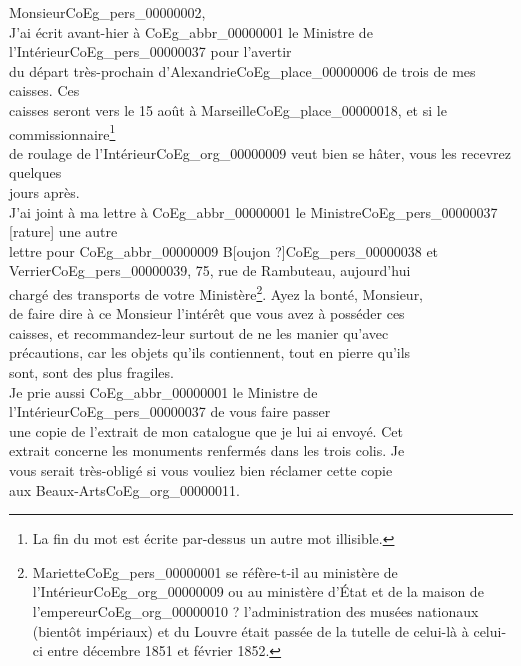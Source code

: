 \documentclass{book}
\begin{document}
\hspace{1cm}Monsieur\gls{CoEg_pers_00000002},\\

\indent J’ai écrit avant-hier à \gls{CoEg_abbr_00000001} le Ministre de l’Intérieur\gls{CoEg_pers_00000037} pour l’avertir\\
du départ très-prochain d’Alexandrie\gls{CoEg_place_00000006} de trois de mes caisses. Ces\\
caisses seront vers le 15 août à Marseille\gls{CoEg_place_00000018}, et si le commissionnaire\footnote{La fin du mot est écrite par-dessus un autre mot illisible.}\\
de roulage de l’Intérieur\gls{CoEg_org_00000009} veut bien se hâter, vous les recevrez quelques\\
jours après.\\
\indent J’ai joint à ma lettre à \gls{CoEg_abbr_00000001} le Ministre\gls{CoEg_pers_00000037} [rature] une autre\\
lettre pour \gls{CoEg_abbr_00000009} B{[oujon ?]}\gls{CoEg_pers_00000038} et Verrier\gls{CoEg_pers_00000039}, 75, rue de Rambuteau, aujourd’hui\\
chargé des transports de votre Ministère\footnote{Mariette\gls{CoEg_pers_00000001} se réfère-t-il au ministère de l'Intérieur\gls{CoEg_org_00000009} ou au ministère d'État et de la maison de l'empereur\gls{CoEg_org_00000010} ? l'administration des musées nationaux (bientôt impériaux) et du Louvre était passée de la tutelle de celui-là à celui-ci entre décembre 1851 et février 1852.}. Ayez la bonté, Monsieur,\\
de faire dire à ce Monsieur l’intérêt que vous avez à posséder ces\\
caisses, et recommandez-leur surtout de ne les manier qu’avec\\
précautions, car les objets qu’ils contiennent, tout en pierre qu’ils\\
sont, sont des plus fragiles.\\
\indent Je prie aussi \gls{CoEg_abbr_00000001} le Ministre de l’Intérieur\gls{CoEg_pers_00000037} de vous faire passer\\
une copie de l’extrait de mon catalogue que je lui ai envoyé. Cet\\
extrait concerne les monuments renfermés dans les trois colis. Je\\
vous serait très-obligé si vous vouliez bien réclamer cette copie\\
aux Beaux-Arts\gls{CoEg_org_00000011}.\\
\end{document}
